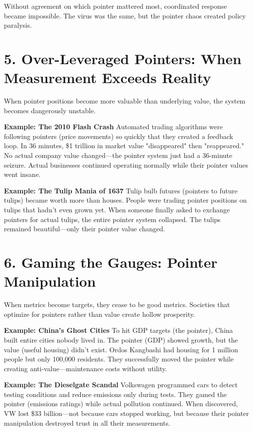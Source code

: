 \documentclass[11pt,oneside]{book}
\begin{document}
Without agreement on which pointer mattered most, coordinated response became impossible. The virus was the same, but the pointer chaos created policy paralysis.

\section{5. Over-Leveraged Pointers: When Measurement Exceeds Reality}

When pointer positions become more valuable than underlying value, the system becomes dangerously unstable.

\textbf{Example: The 2010 Flash Crash}
Automated trading algorithms were following pointers (price movements) so quickly that they created a feedback loop. In 36 minutes, \$1 trillion in market value "disappeared" then "reappeared." No actual company value changed—the pointer system just had a 36-minute seizure. Actual businesses continued operating normally while their pointer values went insane.

\textbf{Example: The Tulip Mania of 1637}
Tulip bulb futures (pointers to future tulips) became worth more than houses. People were trading pointer positions on tulips that hadn't even grown yet. When someone finally asked to exchange pointers for actual tulips, the entire pointer system collapsed. The tulips remained beautiful—only their pointer value changed.

\section{6. Gaming the Gauges: Pointer Manipulation}

When metrics become targets, they cease to be good metrics. Societies that optimize for pointers rather than value create hollow prosperity.

\textbf{Example: China's Ghost Cities}
To hit GDP targets (the pointer), China built entire cities nobody lived in. The pointer (GDP) showed growth, but the value (useful housing) didn't exist. Ordos Kangbashi had housing for 1 million people but only 100,000 residents. They successfully moved the pointer while creating anti-value—maintenance costs without utility.

\textbf{Example: The Dieselgate Scandal}
Volkswagen programmed cars to detect testing conditions and reduce emissions only during tests. They gamed the pointer (emissions ratings) while actual pollution continued. When discovered, VW lost \$33 billion—not because cars stopped working, but because their pointer manipulation destroyed trust in all their measurements.
\end{document}
